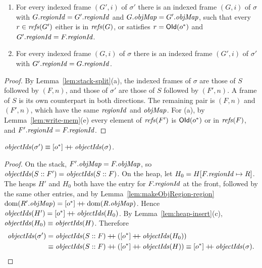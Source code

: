 \begin{lemma}
\label{lem:makeObjRegion-frames}
\begin{enumerate}[nosep,label=(\alph*)]
  \item For every indexed frame $(G', i)$ of $\sigma'$ there is an indexed frame $(G, i)$ of
    $\sigma$ with $G.\mathit{regionId} = G'.\mathit{regionId}$ and
    $G.\mathit{objMap} = G'.\mathit{objMap}$, such that every $r \in \mathit{refs}(G')$ either is in $\mathit{refs}(G)$, or satisfies
    $r = \mathsf{OId}(o^*)$ and $G'.\mathit{regionId} = F.\mathit{regionId}$. 
  \item For every indexed frame $(G, i)$ of $\sigma$ there is an indexed frame $(G', i)$ of
    $\sigma'$ with $G'.\mathit{regionId} = G.\mathit{regionId}$.
\end{enumerate}
\end{lemma}
\begin{proof}
By Lemma~\ref{lem:stack-split}(a), the indexed frames of $\sigma$ are those of $S$ followed by
$(F, n)$, and those of $\sigma'$ are those of $S$ followed by $(F', n)$. A frame of $S$ is its own
counterpart in both directions. The remaining pair is $(F, n)$ and $(F', n)$, which have the same
$\mathit{regionId}$ and $\mathit{objMap}$. For (a), by Lemma~\ref{lem:write-mem}(e) every element of $\mathit{refs}(F')$ is
$\mathsf{OId}(o^*)$ or in $\mathit{refs}(F)$, and $F'.\mathit{regionId} = F.\mathit{regionId}$.
\end{proof}

\begin{lemma}
\label{lem:makeObjRegion-oids}
$\mathit{objectIds}(\sigma') \equiv [o^*] \mathbin{+\!\!+} \mathit{objectIds}(\sigma)$.
\end{lemma}
\begin{proof}
On the stack, $F'.\mathit{objMap} = F.\mathit{objMap}$, so $\mathit{objectIds}(S :: F') = \mathit{objectIds}(S :: F)$. On the heap, let
$H_0 = H[F.\mathit{regionId} \mapsto R]$. The heaps $H'$ and $H_0$ both have the entry for $F.\mathit{regionId}$ at the front,
followed by the same other entries, and by Lemma~\ref{lem:makeObjRegion-region}
$\mathrm{dom}(R'.\mathit{objMap}) = [o^*] \mathbin{+\!\!+} \mathrm{dom}(R.\mathit{objMap})$. Hence $\mathit{objectIds}(H') = [o^*] \mathbin{+\!\!+} \mathit{objectIds}(H_0)$. By
Lemma~\ref{lem:heap-insert}(c), $\mathit{objectIds}(H_0) \equiv \mathit{objectIds}(H)$. Therefore
\begin{align*}
  \oids(\sigma') &= \oids(S :: F) \cat ([o^*] \cat \oids(H_0)) \\
    &\perm \oids(S :: F) \cat ([o^*] \cat \oids(H))
     \perm [o^*] \cat \oids(\sigma). \qedhere
\end{align*}
\end{proof}

